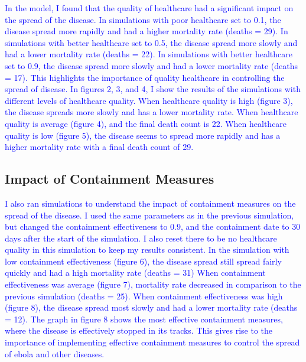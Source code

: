 \documentclass[%
 reprint,
superscriptaddress,
 amsmath,amssymb,
 aps,
floatfix,
]{revtex4-2}
\begin{document}
\textcolor{blue}{
In the model, I found that the quality of healthcare had a significant impact on the spread of the disease. 
In simulations with poor healthcare set to 0.1, the disease spread more rapidly and had a higher mortality rate (deaths = 29). 
In simulations with better healthcare set to 0.5, the disease spread more slowly and had a lower mortality rate (deaths = 22).
In simulations with better healthcare set to 0.9, the disease spread more slowly and had a lower mortality rate (deaths = 17). 
This highlights the importance of quality healthcare in controlling the spread of disease.}
\textcolor{blue}{
   In figures 2, 3, and 4, I show the results of the simulations with different levels of healthcare quality.
   When healthcare quality is high (figure 3), the disease spreads more slowly and has a lower mortality rate. 
   When healthcare quality is average (figure 4), and the final death count is 22.
   When healthcare quality is low (figure 5), the disease seems to spread more rapidly and has a higher mortality rate with a final death count of 29.}
\subsection{Impact of Containment Measures}
\textcolor{blue}{
    I also ran simulations to understand the impact of containment measures on the spread of the disease. 
    I used the same parameters as in the previous simulation, but changed the containment effectiveness to 0.9, and the containment date to 30 days after the start of the simulation.
    I also reset there to be no healthcare quality in this simulation to keep my results consistent.
    In the simulation with low containment effectiveness (figure 6),  the disease spread still spread fairly quickly and had a high mortality rate (deaths = 31)
    When containment effectiveness was average (figure 7), mortality rate decreased in comparison to the previous simulation (deaths = 25).
    When containment effectiveness was high (figure 8), the disease spread most slowly and had a lower mortality rate (deaths = 12).
    The graph in figure 8 shows the most effective containment measures, where the disease is effectively stopped in its tracks.
    This gives rise to the importance of implementing effective containment measures to control the spread of ebola and other diseases.}
\end{document}
